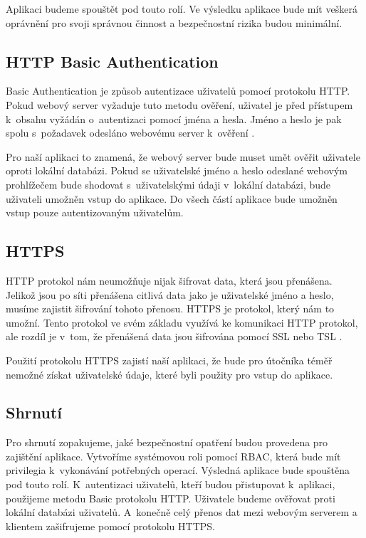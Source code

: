     Aplikaci budeme spouštět pod touto rolí. Ve výsledku aplikace bude mít veškerá oprávnění pro svoji správnou činnost a bezpečnostní rizika budou minimální.
    \subsection{HTTP Basic Authentication}
    \label{httpauth}
    Basic Authentication je způsob autentizace uživatelů pomocí protokolu HTTP. Pokud webový server vyžaduje tuto metodu ověření, uživatel je před přístupem k~obsahu vyžádán o~autentizaci pomocí jména a hesla. Jméno a heslo je pak spolu s~požadavek odesláno webovému server k~ověření \cite{RFC2617}.

    Pro naší aplikaci to znamená, že webový server bude muset umět ověřit uživatele oproti lokální databázi. Pokud se uživatelské jméno a heslo odeslané webovým prohlížečem bude shodovat s~uživatelskými údaji v~lokální databázi, bude uživateli umožněn vstup do aplikace. Do všech částí aplikace bude umožněn vstup pouze autentizovaným uživatelům.

    \subsection{HTTPS}
    \label{https}
    HTTP protokol nám neumožňuje nijak šifrovat data, která jsou přenášena. Jelikož jsou po síti přenášena citlivá data jako je uživatelské jméno a heslo, musíme zajistit šifrování tohoto přenosu. HTTPS je protokol, který nám to umožní. Tento protokol ve svém základu využívá ke komunikaci HTTP protokol, ale rozdíl je v~tom, že přenášená data jsou šifrována pomocí SSL nebo TSL \cite{RFC2818}.

    Použití protokolu HTTPS zajistí naší aplikaci, že bude pro útočníka téměř nemožné získat uživatelské údaje, které byli použity pro vstup do aplikace.
    \subsection{Shrnutí}
    Pro shrnutí zopakujeme, jaké bezpečnostní opatření budou provedena pro zajištění aplikace. Vytvoříme systémovou roli pomocí RBAC, která bude mít privilegia k~vykonávání potřebných operací. Výsledná aplikace bude spouštěna pod touto rolí. K~autentizaci uživatelů, kteří budou přistupovat k~aplikaci, použijeme metodu Basic protokolu HTTP. Uživatele budeme ověřovat proti lokální databázi uživatelů. A~konečně celý přenos dat mezi webovým serverem a klientem zašifrujeme pomocí protokolu HTTPS.

